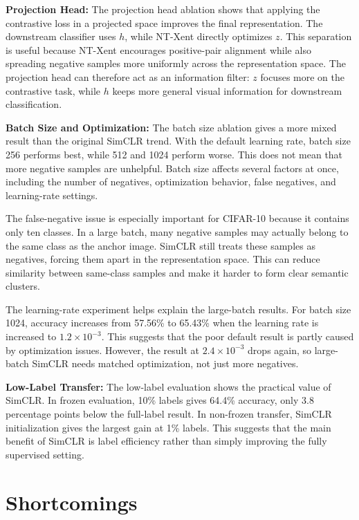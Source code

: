 \documentclass[10pt]{article}
\begin{document}
\textbf{Projection Head: }The projection head ablation shows that applying the contrastive loss in a projected space improves the final representation. The downstream classifier uses $h$, while NT-Xent directly optimizes $z$. This separation is useful because NT-Xent encourages positive-pair alignment while also spreading negative samples more uniformly across the representation space. The projection head can therefore act as an information filter: $z$ focuses more on the contrastive task, while $h$ keeps more general visual information for downstream classification.

\textbf{Batch Size and Optimization: }The batch size ablation gives a more mixed result than the original SimCLR trend. With the default learning rate, batch size 256 performs best, while 512 and 1024 perform worse. This does not mean that more negative samples are unhelpful. Batch size affects several factors at once, including the number of negatives, optimization behavior, false negatives, and learning-rate settings.

The false-negative issue is especially important for CIFAR-10 because it contains only ten classes. In a large batch, many negative samples may actually belong to the same class as the anchor image. SimCLR still treats these samples as negatives, forcing them apart in the representation space. This can reduce similarity between same-class samples and make it harder to form clear semantic clusters.

The learning-rate experiment helps explain the large-batch results. For batch size 1024, accuracy increases from 57.56\% to 65.43\% when the learning rate is increased to $1.2 \times 10^{-3}$. This suggests that the poor default result is partly caused by optimization issues. However, the result at $2.4 \times 10^{-3}$ drops again, so large-batch SimCLR needs matched optimization, not just more negatives.

\textbf{Low-Label Transfer: }The low-label evaluation shows the practical value of SimCLR. In frozen evaluation, 10\% labels gives 64.4\% accuracy, only 3.8 percentage points below the full-label result. In non-frozen transfer, SimCLR initialization gives the largest gain at 1\% labels. This suggests that the main benefit of SimCLR is label efficiency rather than simply improving the fully supervised setting.

\section{Shortcomings}
\end{document}
